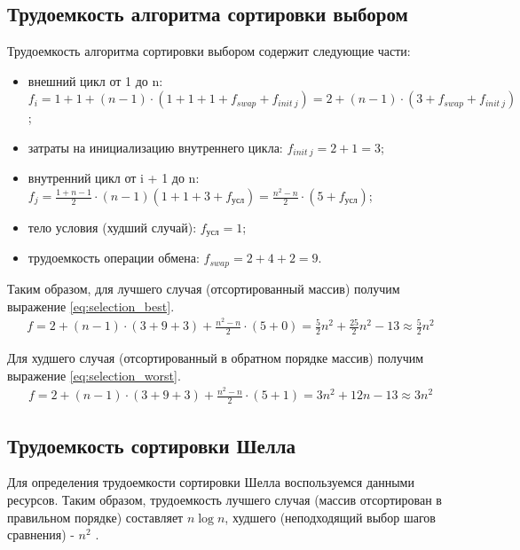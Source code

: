 \documentclass[a4paper,oneside,14pt]{extreport}
\begin{document}
\subsection{Трудоемкость алгоритма сортировки выбором}
Трудоемкость алгоритма сортировки выбором содержит следующие части:
\begin{itemize}
	\item внешний цикл от 1 до n: $f_i = 1 + 1 + (n - 1)\cdot(1 + 1 + 1 + f_{swap} + f_{init\ j}) = 2 + (n - 1)\cdot(3 + f_{swap} + f_{init\ j})$;
	\item затраты на инициализацию внутреннего цикла: $f_{init\ j} = 2 + 1 = 3$;
	\item внутренний цикл от i + 1 до n: $f_j = \frac{1 + n - 1}{2} \cdot (n -1) (1 + 1 + 3 + f_{\text{усл}}) = \frac{n^2 - n}{2} \cdot(5 + f_{\text{усл}})$; 
	\item тело условия (худший случай): $f_{\text{усл}} = 1$;
	\item трудоемкость операции обмена: $f_{swap} = 2 + 4 + 2 = 9$.
\end{itemize}

Таким образом, для лучшего случая (отсортированный массив) получим выражение \ref{eq:selection_best}.
\begin{equation} \label{eq:selection_best}
\begin{array}{ll}
f = 2 + (n - 1)\cdot(3 + 9 + 3) + \frac{n^2 - n}{2} \cdot(5 + 0) = \frac{5}{2} n^2 + \frac{25}{2}n^2 - 13 \approx \frac{5}{2}n^2
\end{array}
\end{equation}

Для худшего случая (отсортированный в обратном порядке массив) получим выражение \ref{eq:selection_worst}.
\begin{equation} \label{eq:selection_worst}
\begin{array}{ll}
f = 2 + (n - 1)\cdot(3 + 9 + 3) + \frac{n^2 - n}{2} \cdot(5 + 1) = 3n^2 + 12n - 13 \approx 3n^2
\end{array}
\end{equation}

\subsection{Трудоемкость сортировки Шелла}
Для определения трудоемкости сортировки Шелла воспользуемся данными ресурсов. Таким образом, трудоемкость лучшего случая (массив отсортирован в правильном порядке) составляет $n\log n$, худшего (неподходящий выбор шагов сравнения) - $n^2$ \cite{ShellEff}.
\end{document}
